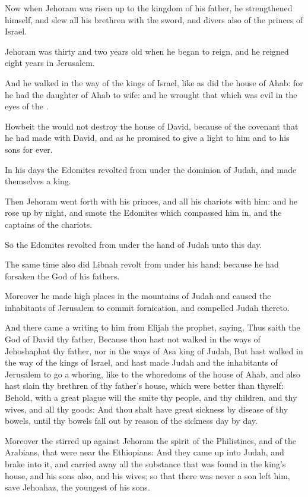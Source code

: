 \verse Now when Jehoram was risen up to the kingdom of his father, he strengthened himself, and slew all his brethren with the sword, and divers also of the princes of Israel.

\verse Jehoram was thirty and two years old when he began to reign, and he reigned eight years in Jerusalem.

\verse And he walked in the way of the kings of Israel, like as did the house of Ahab: for he had the daughter of Ahab to wife: and he wrought that which was evil in the eyes of the \LORD.

\verse Howbeit the \LORD would not destroy the house of David, because of the covenant that he had made with David, and as he promised to give a light to him and to his sons for ever.

\verse In his days the Edomites revolted from under the dominion of Judah, and made themselves a king.

\verse Then Jehoram went forth with his princes, and all his chariots with him: and he rose up by night, and smote the Edomites which compassed him in, and the captains of the chariots.

\verse So the Edomites revolted from under the hand of Judah unto this day.

The same time also did Libnah revolt from under his hand; because he had forsaken the \LORD God of his fathers.

\verse Moreover he made high places in the mountains of Judah and caused the inhabitants of Jerusalem to commit fornication, and compelled Judah thereto.

\verse And there came a writing to him from Elijah the prophet, saying, Thus saith the \LORD God of David thy father, Because thou hast not walked in the ways of Jehoshaphat thy father, nor in the ways of Asa king of Judah, \verse But hast walked in the way of the kings of Israel, and hast made Judah and the inhabitants of Jerusalem to go a whoring, like to the whoredoms of the house of Ahab, and also hast slain thy brethren of thy father's house, which were better than thyself: \verse Behold, with a great plague will the \LORD smite thy people, and thy children, and thy wives, and all thy goods: \verse And thou shalt have great sickness by disease of thy bowels, until thy bowels fall out by reason of the sickness day by day.

\verse Moreover the \LORD stirred up against Jehoram the spirit of the Philistines, and of the Arabians, that were near the Ethiopians: \verse And they came up into Judah, and brake into it, and carried away all the substance that was found in the king's house, and his sons also, and his wives; so that there was never a son left him, save Jehoahaz, the youngest of his sons.

